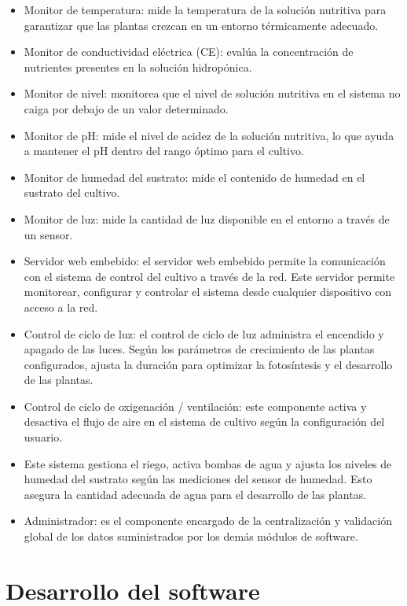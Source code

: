 \begin{itemize}
	\item Monitor de temperatura: mide la temperatura de la solución nutritiva para garantizar que las plantas crezcan en un entorno térmicamente adecuado.
	\item Monitor de conductividad eléctrica (CE): evalúa la concentración de nutrientes presentes en la solución hidropónica.
	\item Monitor de nivel: monitorea que el nivel de solución nutritiva en el sistema no caiga por debajo de un valor determinado.
	\item Monitor de pH: mide el nivel de acidez de la solución nutritiva, lo que ayuda a mantener el pH dentro del rango óptimo para el cultivo.
	\item Monitor de humedad del sustrato: mide el contenido de humedad en el sustrato del cultivo.
	\item Monitor de luz: mide la cantidad de luz disponible en el entorno a través de un sensor.
	\item Servidor web embebido: el servidor web embebido permite la comunicación con el sistema de control del cultivo a través de la red. Este servidor permite monitorear, configurar y controlar el sistema desde cualquier dispositivo con acceso a la red.
	\item Control de ciclo de luz: el control de ciclo de luz administra el encendido y apagado de las luces. Según los parámetros de crecimiento de las plantas configurados, ajusta la duración para optimizar la fotosíntesis y el desarrollo de las plantas.
	\item Control de ciclo de oxigenación / ventilación: este componente activa y desactiva el flujo de aire en el sistema de cultivo según la configuración del usuario.
	\item Este sistema gestiona el riego, activa bombas de agua y ajusta los niveles de humedad del sustrato según las mediciones del sensor de humedad. Esto asegura la cantidad adecuada de agua para el desarrollo de las plantas.
	\item Administrador: es el componente encargado de la centralización y validación global de los datos suministrados por los demás módulos de software.
\end{itemize}

\section{Desarrollo del software}

